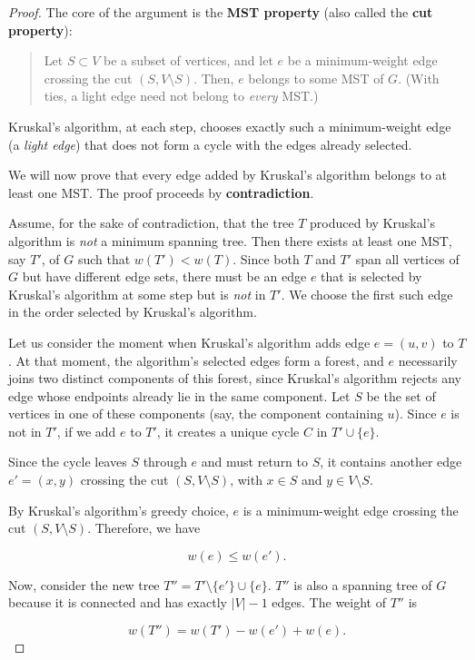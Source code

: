 \begin{proof}
The core of the argument is the \textbf{MST property} (also called the \textbf{cut property}):
\begin{quote}
Let $S \subset V$ be a subset of vertices, and let $e$ be a minimum-weight edge crossing the cut $(S, V \setminus S)$. Then, $e$ belongs to some MST of $G$. (With ties, a light edge need not belong to \emph{every} MST.)
\end{quote}
Kruskal's algorithm, at each step, chooses exactly such a minimum-weight edge (a \emph{light edge}) that does not form a cycle with the edges already selected.

We will now prove that every edge added by Kruskal's algorithm belongs to at least one MST. The proof proceeds by \textbf{contradiction}.

Assume, for the sake of contradiction, that the tree $T$ produced by Kruskal's algorithm is \emph{not} a minimum spanning tree. Then there exists at least one MST, say $T'$, of $G$ such that $w(T') < w(T)$. Since both $T$ and $T'$ span all vertices of $G$ but have different edge sets, there must be an edge $e$ that is selected by Kruskal's algorithm at some step but is \emph{not} in $T'$. We choose the first such edge in the order selected by Kruskal's algorithm.

Let us consider the moment when Kruskal's algorithm adds edge $e = (u,v)$ to $T$. At that moment, the algorithm's selected edges form a forest, and $e$ necessarily joins two distinct components of this forest, since Kruskal's algorithm rejects any edge whose endpoints already lie in the same component. Let $S$ be the set of vertices in one of these components (say, the component containing $u$). Since $e$ is not in $T'$, if we add $e$ to $T'$, it creates a unique cycle $C$ in $T' \cup \{e\}$.

Since the cycle leaves $S$ through $e$ and must return to $S$, it contains another edge $e'=(x,y)$ crossing the cut $(S, V\setminus S)$, with $x\in S$ and $y\in V\setminus S$.

By Kruskal's algorithm's greedy choice, $e$ is a minimum-weight edge crossing the cut $(S, V \setminus S)$. Therefore, we have

\[w(e) \leq w(e').\]

Now, consider the new tree $T'' = T' \setminus \{e' \} \cup \{e\}$. $T''$ is also a spanning tree of $G$ because it is connected and has exactly $|V|-1$ edges. The weight of $T''$ is

\[w(T'') = w(T') - w(e') + w(e).\]


\end{proof}
